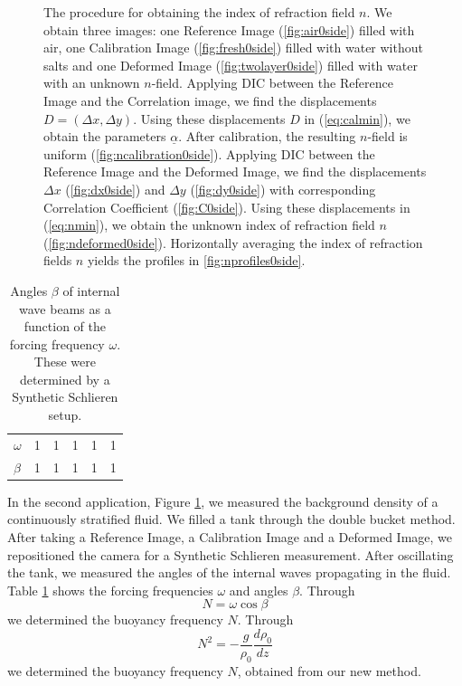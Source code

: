 \documentclass{svjour3}                     %
\begin{document}
\begin{figure}[htbp]
\caption{The procedure for obtaining the index of refraction field $n$. We obtain three images: one Reference Image (\ref{fig:air0side}) filled with air, one Calibration Image (\ref{fig:fresh0side}) filled with water without salts and one Deformed Image (\ref{fig:twolayer0side}) filled with water with an unknown $n$-field. Applying DIC between the Reference Image and the Correlation image, we find the displacements $D=(\Delta x, \Delta y)$. Using these displacements $D$ in (\ref{eq:calmin}), we obtain the parameters $\underline{\alpha}$. After calibration, the resulting $n$-field is uniform (\ref{fig:ncalibration0side}). Applying DIC between the Reference Image and the Deformed Image, we find the displacements $\Delta x$ (\ref{fig:dx0side}) and $\Delta y$ (\ref{fig:dy0side}) with corresponding Correlation Coefficient (\ref{fig:C0side}).  Using these displacements in (\ref{eq:nmin}), we obtain the unknown index of refraction field $n$ (\ref{fig:ndeformed0side}). Horizontally averaging the index of refraction fields $n$ yields the profiles in \ref{fig:nprofiles0side}.}
\label{fig:0side}
\end{figure}

\begin{table}[htbp]
\caption{Angles $\beta$ of internal wave beams as a function of the forcing frequency $\omega$. These were determined by a Synthetic Schlieren setup.}
\label{tab:SSintwav}
\centering
\begin{tabular}{llllll}
$\omega$ & 1 & 1 & 1 & 1 & 1  \\
$\beta$  & 1 & 1 & 1 & 1 & 1
\end{tabular}
\end{table}

In the second application, Figure \ref{fig:0side}, we measured the background density of a continuously stratified fluid. We filled a tank through the double bucket method. After taking a Reference Image, a Calibration Image and a Deformed Image, we repositioned the camera for a Synthetic Schlieren measurement. After oscillating the tank, we measured the angles of the internal waves propagating in the fluid. Table \ref{tab:SSintwav} shows the forcing frequencies $\omega$ and angles $\beta$. Through
\begin{equation}
	N = \omega \cos \beta
\end{equation}
we determined the buoyancy frequency $N$. Through
\begin{equation}
	N^2 = - \frac{g}{\rho_0}\frac{d \rho_0}{d z}
\end{equation}
we determined the buoyancy frequency $N$, obtained from our new method. 
\end{document}
